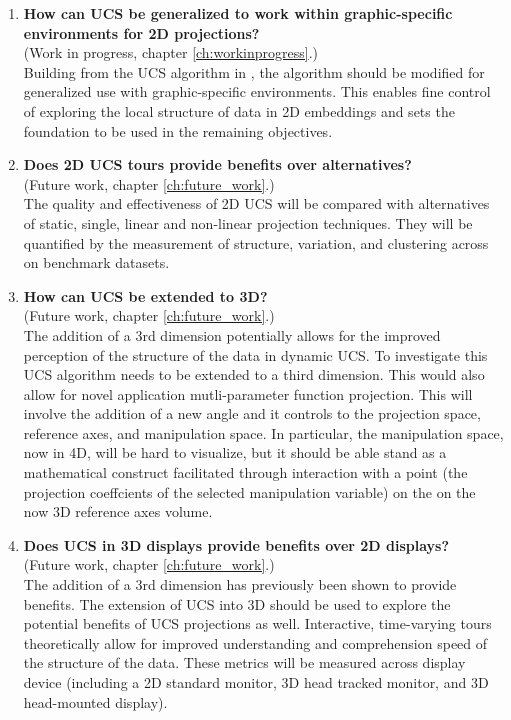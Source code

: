 \documentclass{monashthesis}
\begin{document}
\begin{enumerate}
\def\labelenumi{\arabic{enumi}.}
\item
  \textbf{How can UCS be generalized to work within graphic-specific
  environments for 2D projections?}\\
  (Work in progress, chapter \ref{ch:workinprogress}.)\\
  Building from the UCS algorithm in \textcite{cook_manual_1997}, the
  algorithm should be modified for generalized use with graphic-specific
  environments. This enables fine control of exploring the local
  structure of data in 2D embeddings and sets the foundation to be used
  in the remaining objectives.
\item
  \textbf{Does 2D UCS tours provide benefits over alternatives?}\\
  (Future work, chapter \ref{ch:future_work}.)\\
  The quality and effectiveness of 2D UCS will be compared with
  alternatives of static, single, linear and non-linear projection
  techniques. They will be quantified by the measurement of structure,
  variation, and clustering across on benchmark datasets.
\item
  \textbf{How can UCS be extended to 3D?}\\
  (Future work, chapter \ref{ch:future_work}.)\\
  The addition of a 3rd dimension potentially allows for the improved
  perception of the structure of the data in dynamic UCS. To investigate
  this UCS algorithm needs to be extended to a third dimension. This
  would also allow for novel application mutli-parameter function
  projection. This will involve the addition of a new angle and it
  controls to the projection space, reference axes, and manipulation
  space. In particular, the manipulation space, now in 4D, will be hard
  to visualize, but it should be able stand as a mathematical construct
  facilitated through interaction with a point (the projection
  coeffcients of the selected manipulation variable) on the on the now
  3D reference axes volume.
\item
  \textbf{Does UCS in 3D displays provide benefits over 2D displays?}\\
  (Future work, chapter \ref{ch:future_work}.)\\
  The addition of a 3rd dimension has previously been shown to provide
  benefits. The extension of UCS into 3D should be used to explore the
  potential benefits of UCS projections as well. Interactive,
  time-varying tours theoretically allow for improved understanding and
  comprehension speed of the structure of the data. These metrics will
  be measured across display device (including a 2D standard monitor, 3D
  head tracked monitor, and 3D head-mounted display).
\end{enumerate}
\end{document}
